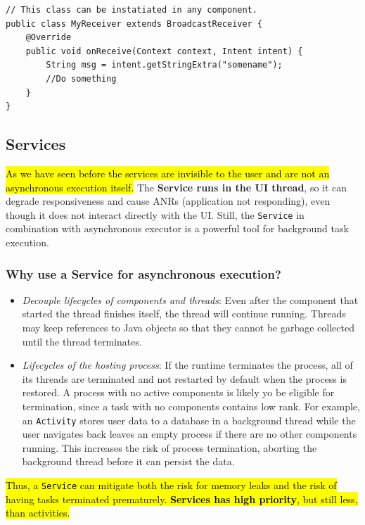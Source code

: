 \begin{lstlisting}[title=The receiver]
// This class can be instatiated in any component. 
public class MyReceiver extends BroadcastReceiver {
    @Override
    public void onReceive(Context context, Intent intent) {
        String msg = intent.getStringExtra("somename");
        //Do something
    }
}
\end{lstlisting}

\subsection{Services}

\hl{As we have seen before the services are invisible to the user and are not an
asynchronous execution itself.} The \textbf{Service runs in the UI thread}, so it 
can degrade responsiveness and cause ANRs (application not responding), even 
though it does not interact directly with the UI. Still, the \texttt{Service} in 
combination with asynchronous executor is a powerful tool for background task 
execution. 

\subsubsection{Why use a Service for asynchronous execution?}

\begin{itemize}
    \item \textit{Decouple lifecycles of components and threads}: Even after 
    the component that started the thread finishes itself, the thread will continue 
    running. Threads may keep references to Java objects so that they cannot be 
    garbage collected until the thread terminates. 
    \item \textit{Lifecycles of the hosting process}: If the runtime terminates the 
    process, all of its threads are terminated and not restarted by default when the 
    process is restored. A process with no active components is likely yo be eligible 
    for termination, since a task with no components contains low rank. For example, 
    an \texttt{Activity} stores user data to a database in a background thread
    while the user navigates back leaves an empty process if there are no other 
    components running. This increases the risk of process termination, aborting the 
    background thread before it can persist the data. 
\end{itemize}

\hl{Thus, a \texttt{Service} can mitigate both the risk for memory leaks and the risk of 
having tasks terminated prematurely. \textbf{Services has high priority}, but still 
less, than activities.}

